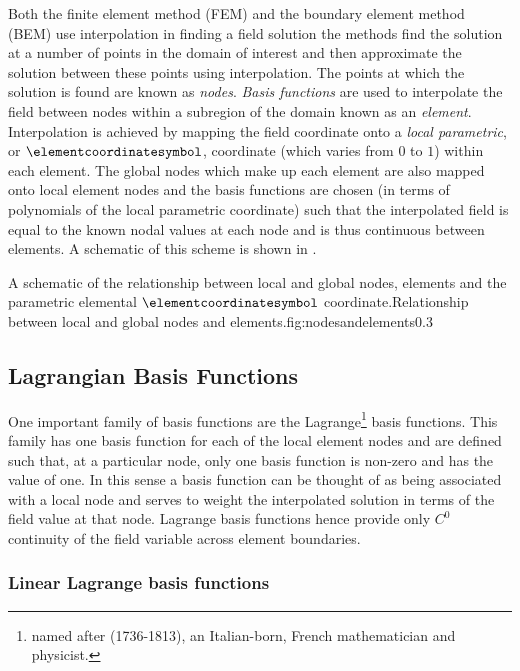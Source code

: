 Both the finite element method (FEM) and the boundary element method (BEM) use
interpolation in finding a field solution \ie the methods find the solution at
a number of points in the domain of interest and then approximate the solution
between these points using interpolation. The points at which the solution is
found are known as \emph{nodes}. \emph{Basis functions} are used to
interpolate the field between nodes within a subregion of the domain known as
an \emph{element}. Interpolation is achieved by mapping the field coordinate
onto a \emph{local parametric}, or $\elementcoordinatesymbol$, coordinate (which varies from $0$ to
$1$) within each element. The global nodes which make up each element are also
mapped onto local element nodes and the basis functions are chosen (in terms
of polynomials of the local parametric coordinate) such that the interpolated
field is equal to the known nodal values at each node and is thus continuous
between elements. A schematic of this
scheme is shown in .

{A schematic of the relationship between local and global nodes, elements and the parametric elemental $\elementcoordinatesymbol$
  coordinate.}{Relationship between local and global nodes and elements.}{fig:nodesandelements}{0.3}

\subsection{Lagrangian Basis Functions}
\label{sec:lagrangebasisfunctions}

One important family of basis functions are the Lagrange\footnote{named after
(1736-1813), an Italian-born, French mathematician and physicist.} basis functions. This
family has one basis function for each of the local element nodes and are
defined such that, at a particular node, only one basis function is non-zero
and has the value of one. In this sense a basis function can be thought of as
being associated with a local node and serves to weight the interpolated
solution in terms of the field value at that node. Lagrange basis functions
hence provide only $C^{0}$ continuity of the field variable across element
boundaries.

\subsubsection{Linear Lagrange basis functions}

